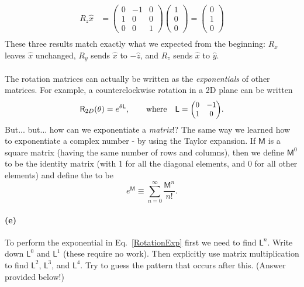 \documentclass{article}
\begin{document}
\begin{solution}
\begin{align*}
			R_z \hat{x} &=  \begin{pmatrix} 0&-1&0\\1&0&0\\0&0&1 \end{pmatrix} \begin{pmatrix} 1\\0\\0 \end{pmatrix} = \begin{pmatrix} 0\\1\\0 \end{pmatrix} 
\\
		\end{align*}
		These three results match exactly what we expected from the beginning: $R_x$ leaves $\hat{x}$ unchanged,
		$R_y$ sends $\hat{x}$ to $-\hat{z}$, and $R_z$ sends $\hat{x}$ to $\hat{y}$. 
	\end{solution}

\paragraph{}
The rotation matrices can actually be written as the \emph{exponentials} of other matrices.  For example, a counterclockwise rotation in a 2D plane can be written
	\begin{equation}
		\mathsf{R}_{2D}(\theta) = e^{\theta \mathsf{L}}, \qquad \mbox{where} \quad 	\mathsf{L} = \smmatrix{0.9}{0 & -1 \\ 1 & 0}.
	\label{RotationExp}
	\end{equation}
But... but... how can we exponentiate a \emph{matrix}!?  The same way we learned how to exponentiate a complex number - by using the Taylor expansion.  If
$\mathsf{M}$ is a square matrix (having the same number of rows and columns), then we define $\mathsf{M}^{0}$ to be the identity matrix (with 1 for all the diagonal elements, 
and 0 for all other elements) and define the  to be
	\begin{equation*}
		e^{\mathsf{M}} \equiv \sum_{n=0}^{\infty} \frac{\mathsf{M}^{n}}{n!}.
	\end{equation*}


\paragraph{(e)}
To perform the exponential in Eq.~\ref{RotationExp} first we need to find $\mathsf{L}^{n}$.  Write down $\mathsf{L}^{0}$ and $\mathsf{L}^{1}$ (these require no work).  Then
explicitly use matrix multiplication to find $\mathsf{L}^{2}$, $\mathsf{L}^{3}$, and $\mathsf{L}^{4}$.  Try to guess the pattern that occurs after this. (Answer provided below!)
\end{document}
